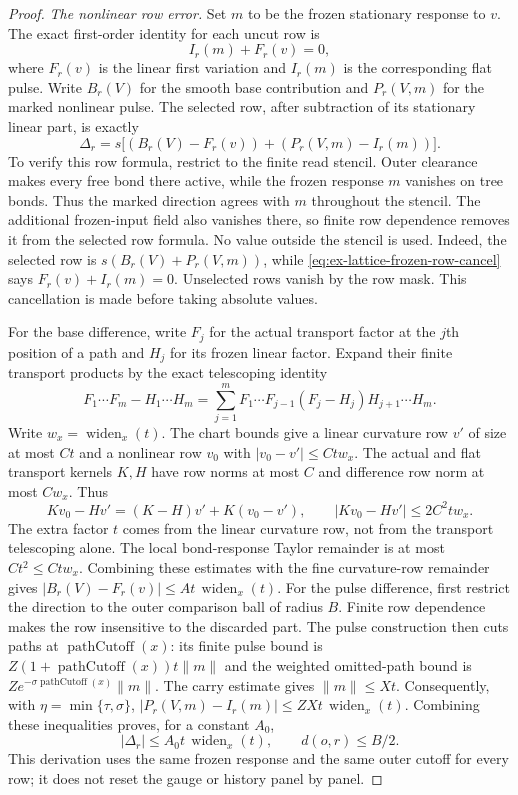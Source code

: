\begin{proof}
\emph{The nonlinear row error.}
Set $m$ to be the frozen stationary response to $v$.  The exact
first-order identity for each uncut row is
\begin{equation}\label{eq:ex-lattice-frozen-row-cancel}
 I_r(m)+F_r(v)=0,
\end{equation}
where $F_r(v)$ is the linear first variation and $I_r(m)$ is the
corresponding flat pulse. Write $B_r(V)$ for the smooth base
contribution and $P_r(V,m)$ for the marked nonlinear pulse. The
selected row, after subtraction of its stationary linear part, is
exactly
\[
 \Delta_r=s\bigl[(B_r(V)-F_r(v))+(P_r(V,m)-I_r(m))\bigr].
\]
To verify this row formula, restrict to the finite read stencil.
Outer clearance makes every free bond there active, while the frozen
response $m$ vanishes on tree bonds. Thus the marked direction agrees
with $m$ throughout the stencil. The additional frozen-input field
also vanishes there, so finite row dependence removes it from the
selected row formula. No value outside the stencil is used.
Indeed, the selected row is $s(B_r(V)+P_r(V,m))$, while
\eqref{eq:ex-lattice-frozen-row-cancel} says $F_r(v)+I_r(m)=0$.
Unselected rows vanish by the row mask.  This cancellation is made
before taking absolute values.

For the base difference, write $F_j$ for the actual transport factor
at the $j$th position of a path and $H_j$ for its frozen linear
factor. Expand their finite transport products by the exact
telescoping identity
\[
 F_1\cdots F_m-H_1\cdots H_m
 =\sum_{j=1}^mF_1\cdots F_{j-1}(F_j-H_j)H_{j+1}\cdots H_m.
\]
Write $w_x=\operatorname{widen}_x(t)$. The chart bounds give a linear
curvature row $v'$ of size at most $Ct$ and a nonlinear row $v_0$
with $|v_0-v'|\le Ct w_x$. The actual and flat transport kernels
$K,H$ have row norms at most $C$ and difference row norm at most
$Cw_x$. Thus
\[
 Kv_0-Hv'=(K-H)v'+K(v_0-v'),\qquad
 |Kv_0-Hv'|\le 2C^2t w_x.
\]
The extra factor $t$ comes from the linear curvature row, not from
the transport telescoping alone. The local bond-response Taylor
remainder is at most $Ct^2\le Ct w_x$. Combining these estimates
with the fine curvature-row remainder gives
$|B_r(V)-F_r(v)|\le A t\,\operatorname{widen}_x(t)$.
For the pulse difference, first restrict the direction to the outer
comparison ball of radius $B$. Finite row dependence makes the row
insensitive to the discarded part. The pulse construction then cuts
paths at $\operatorname{pathCutoff}(x)$: its finite pulse bound is
$Z(1+\operatorname{pathCutoff}(x))t\|m\|$ and the weighted omitted-path
bound is $Z e^{-\sigma\operatorname{pathCutoff}(x)}\|m\|$. The carry
estimate gives $\|m\|\le Xt$. Consequently, with
$\eta=\min\{\tau,\sigma\}$,
$|P_r(V,m)-I_r(m)|\le ZXt\,\operatorname{widen}_x(t)$.
Combining these inequalities proves, for a constant $A_0$,
\begin{equation}\label{eq:ex-lattice-row-delta}
 |\Delta_r|\le A_0t\,\operatorname{widen}_x(t),
 \qquad d(o,r)\le B/2.
\end{equation}
This derivation uses the same frozen response and the same outer
cutoff for every row; it does not reset the gauge or history panel by
panel.


\end{proof}
